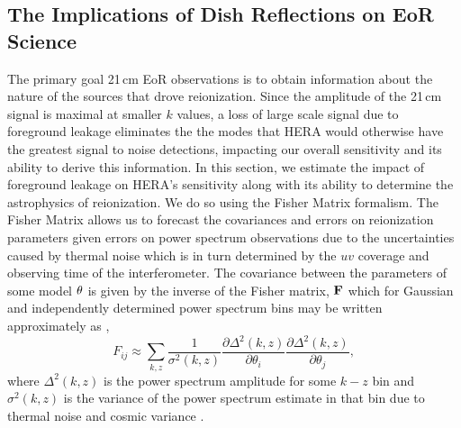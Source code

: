 \documentclass[twocolumn]{emulateapj}
\begin{document}
\subsection{The Implications of Dish Reflections on EoR Science}
The primary goal 21\,cm EoR observations is to obtain information about the nature of the sources that drove reionization. Since the amplitude of the 21\,cm signal is maximal at smaller $k$ values, a loss of large scale signal due to foreground leakage eliminates the the modes that HERA would otherwise have the greatest signal to noise detections, impacting our overall sensitivity and its ability to derive this information. In this section, we estimate the impact of foreground leakage on HERA's sensitivity along with its ability to determine the astrophysics of reionization. We do so using the Fisher Matrix formalism. The Fisher Matrix allows us to forecast the covariances and errors on reionization parameters given errors on power spectrum observations due to the uncertainties caused by thermal noise which is in turn determined by the $uv$ coverage and observing time of the interferometer. The covariance between the parameters of some model ${\bf \theta}$ is given by the inverse of the Fisher matrix, ${\bf F}$ which for Gaussian and independently determined power spectrum bins may be written approximately as \citep{Pober:2014,EwallWice:2015a},
\begin{equation}\label{eq:Fisher}
F_{ij} \approx \sum_{k,z} \frac{1}{\sigma^2(k,z)} \frac{\partial \Delta^2(k,z)}{\partial \theta_i} \frac{\partial \Delta^2(k,z)}{\partial \theta_j},
\end{equation}
where $\Delta^2(k,z)$ is the power spectrum amplitude for some $k-z$ bin and $\sigma^2(k,z)$ is the variance of the power spectrum estimate in that bin due to thermal noise and cosmic variance \citep{Beardsley:2013}. 
\end{document}
